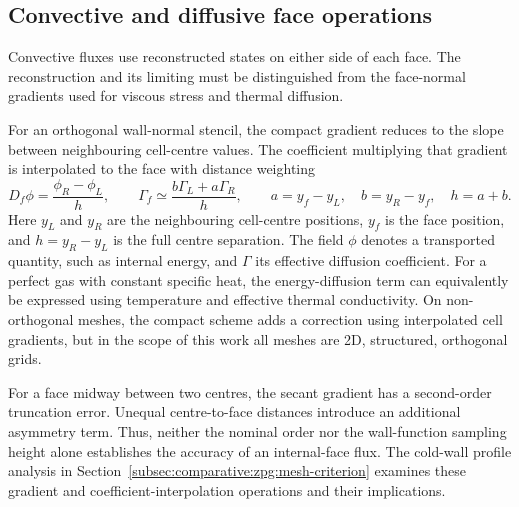 \subsection{Convective and diffusive face operations}

Convective fluxes use reconstructed states on either side of each face.
The reconstruction and its limiting must be distinguished from the
face-normal gradients used for viscous stress and thermal diffusion.
\par\medskip

For an orthogonal wall-normal stencil, the compact gradient reduces to the
slope between neighbouring cell-centre values. The coefficient multiplying
that gradient is interpolated to the face with distance weighting
\begin{equation}
    D_f\phi=\frac{\phi_R-\phi_L}{h},
    \qquad
    \Gamma_f\simeq\frac{b\Gamma_L+a\Gamma_R}{h},
    \qquad
    a=y_f-y_L,\quad b=y_R-y_f,\quad h=a+b.
    \label{eq:numerical-framework:internal-face-operators}
\end{equation}
Here \(y_L\) and \(y_R\) are the neighbouring cell-centre positions, \(y_f\)
is the face position, and \(h=y_R-y_L\) is the full centre separation.
The field \(\phi\) denotes a transported quantity, such as internal energy,
and \(\Gamma\) its effective diffusion coefficient. For a perfect gas with
constant specific heat, the energy-diffusion term can equivalently be
expressed using temperature and effective thermal conductivity. On non-orthogonal
meshes, the compact scheme adds a correction using interpolated cell
gradients, but in the scope of this work all meshes are 2D, structured, orthogonal grids.
\par\medskip

For a face midway between two centres, the secant gradient has a
second-order truncation error. Unequal centre-to-face distances introduce
an additional asymmetry term. Thus, neither the nominal order nor the
wall-function sampling height alone establishes the accuracy of an
internal-face flux. The cold-wall profile analysis in
Section~\ref{subsec:comparative:zpg:mesh-criterion} examines these gradient
and coefficient-interpolation operations and their implications.
